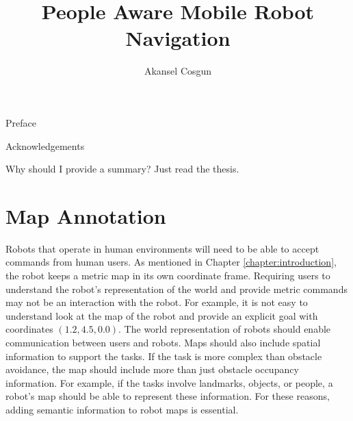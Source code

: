 \documentclass[12pt]{gatech-thesis}
\title{People Aware Mobile Robot Navigation} %
\author{Akansel Cosgun}
\begin{document}
%

\begin{preliminary}



\begin{preface}
Preface
\end{preface}
\begin{acknowledgements}
Acknowledgements
\end{acknowledgements}
\contents
\begin{summary}
Why should I provide a summary?  Just read the thesis.
\end{summary}
\end{preliminary}



%



\chapter{Map Annotation}
\label{chapter:map_annotation}

Robots that operate in human environments will need to be able to accept commands from human users. As mentioned in Chapter \ref{chapter:introduction}, the robot keeps a metric map in its own coordinate frame. Requiring users to understand the robot's representation of the world and provide metric commands may not be an interaction with the robot. For example, it is not easy to understand look at the map of the robot and provide an explicit  goal with coordinates $(1.2,4.5,0.0)$. The world representation of robots should enable communication between users and robots. Maps should also include spatial information to support the tasks. If the task is more complex than obstacle avoidance, the map should include more than just obstacle occupancy information. For example, if the tasks involve landmarks, objects, or people, a robot's map should be able to represent these information. For these reasons, adding semantic information to robot maps is essential.
\end{document}
